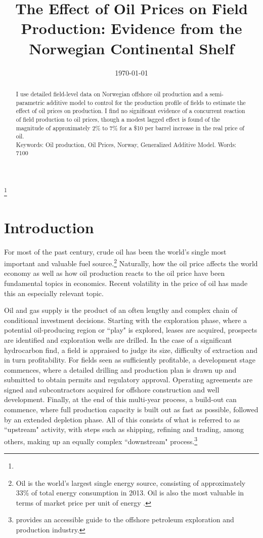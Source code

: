 \documentclass[12pt]{article}
\title{The Effect of Oil Prices on Field Production: Evidence from the Norwegian Continental Shelf}
\date{\today}
\begin{document}
 \begin{spacing}{1} %
	\maketitle

\begin{abstract}
I use detailed field-level data on Norwegian offshore oil production and a semi-parametric additive model to control for the production profile of fields to estimate the effect of oil prices on production. I find no significant evidence of a concurrent reaction of field production to oil prices, though a modest lagged effect is found of the magnitude of approximately 2\% to 7\% for a \$10 per barrel increase in the real price of oil.\\
Keywords: Oil production, Oil Prices, Norway, Generalized Additive Model.
Words: 7100
\end{abstract}

\thanks{}
 \end{spacing}

\section{Introduction}

For most of the past century, crude oil has been the world's single most important and valuable fuel source.\footnote{Oil is the world's largest single energy source, consisting of approximately 33\% of total energy consumption in 2013. Oil is also the most valuable in terms of market price per unit of energy \citep{british_petroleum_statistical_2013}.} Naturally, how the oil price affects the world economy as well as how oil production reacts to the oil price have been fundamental topics in economics. Recent volatility in the price of oil has made this an especially relevant topic.

Oil and gas supply is the product of an often lengthy and complex chain of conditional investment decisions. Starting with the exploration phase, where a potential oil-producing region or ``play" is explored, leases are acquired, prospects are identified and exploration wells are drilled. In the case of a significant hydrocarbon find, a field is appraised to judge its size, difficulty of extraction and in turn profitability. For fields seen as sufficiently profitable, a development stage commences, where a detailed drilling and production plan is drawn up and submitted to obtain permits and regulatory approval. Operating agreements are signed and subcontractors acquired for offshore construction and well development. Finally, at the end of this multi-year process, a build-out can commence, where full production capacity is built out as fast as possible, followed by an extended depletion phase. All of this consists of what is referred to as ``upstream" activity, with steps such as shipping, refining and trading, among others, making up an equally complex ``downstream" process.\footnote{\citet{lefler_deepwater_2011} provides an accessible guide to the offshore petroleum exploration and production industry.} 
\end{document}
